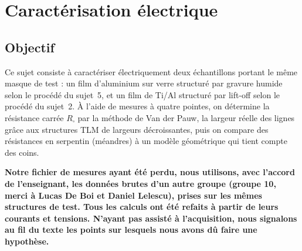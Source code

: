 \providecommand{\Rsq}{\ensuremath{R_{\square}}}

\section{Caractérisation électrique}

\subsection{Objectif}
Ce sujet consiste à caractériser électriquement deux échantillons portant le même masque de test \cite{intro,prot6} : un film d'aluminium sur verre structuré par gravure humide selon le procédé du sujet~5, et un film de Ti/Al structuré par lift-off selon le procédé du sujet~2. À l'aide de mesures à quatre pointes, on détermine la résistance carrée \Rsq{} par la méthode de Van der Pauw, la largeur réelle des lignes grâce aux structures TLM de largeurs décroissantes, puis on compare des résistances en serpentin (méandres) à un modèle géométrique qui tient compte des coins.

\textbf{Notre fichier de mesures ayant été perdu, nous utilisons, avec l'accord de l'enseignant, les données brutes d'un autre groupe (groupe 10, merci à Lucas De Boi et Daniel Lelescu), prises sur les mêmes structures de test. Tous les calculs ont été refaits à partir de leurs courants et tensions. N'ayant pas assisté à l'acquisition, nous signalons au fil du texte les points sur lesquels nous avons dû faire une hypothèse.}


